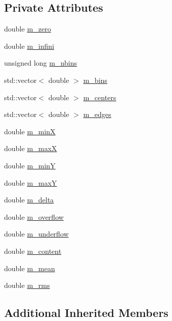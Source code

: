 \subsection*{Private Attributes}
\begin{DoxyCompactItemize}
\item 
double \hyperlink{classHisto1D_ac87bd1971cc300ce6fc1e745785cacb9}{m\+\_\+zero}
\item 
double \hyperlink{classHisto1D_a47c1ba33be0574ca167f43a1b27ba1a0}{m\+\_\+infini}
\item 
unsigned long \hyperlink{classHisto1D_a1913aca9a278b4bfd365f35b85e65d8d}{m\+\_\+nbins}
\item 
std\+::vector$<$ double $>$ \hyperlink{classHisto1D_a7a82923d3938739904469f5aa0a517ca}{m\+\_\+bins}
\item 
std\+::vector$<$ double $>$ \hyperlink{classHisto1D_a0e03676ed176aaad2f615fa84b8ffcd3}{m\+\_\+centers}
\item 
std\+::vector$<$ double $>$ \hyperlink{classHisto1D_a4188c6d1b4bfc8f9d8bde7616b4dbf5b}{m\+\_\+edges}
\item 
double \hyperlink{classHisto1D_af5ce58b20e96fa6e4b306109dd88589e}{m\+\_\+minX}
\item 
double \hyperlink{classHisto1D_a6a5007569e096537f9b7b39d2aad865b}{m\+\_\+maxX}
\item 
double \hyperlink{classHisto1D_a3bb6c3ea23a1af14ebb10af807f3810d}{m\+\_\+minY}
\item 
double \hyperlink{classHisto1D_a28a8995424e36088c47643f8c1a7fa7f}{m\+\_\+maxY}
\item 
double \hyperlink{classHisto1D_a993e2e40b89e257e6f86c0742f6f06b3}{m\+\_\+delta}
\item 
double \hyperlink{classHisto1D_ab60b2ec4e435a3094b7ec218404aa16f}{m\+\_\+overflow}
\item 
double \hyperlink{classHisto1D_a7f475b822f4bbb23209e2e523d228380}{m\+\_\+underflow}
\item 
double \hyperlink{classHisto1D_a75f4abeae577e232f4c012cb6b4049d7}{m\+\_\+content}
\item 
double \hyperlink{classHisto1D_a7e49893543fb5d2af37167690bc0b0ff}{m\+\_\+mean}
\item 
double \hyperlink{classHisto1D_a1331c670df40eb18d8a814f5a15ec7da}{m\+\_\+rms}
\end{DoxyCompactItemize}
\subsection*{Additional Inherited Members}


